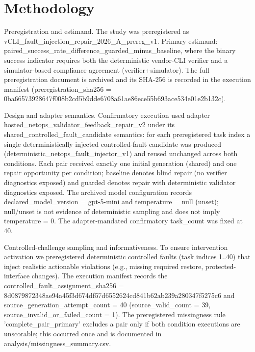 \documentclass[conference]{IEEEtran}
\begin{document}
\section{Methodology}
Preregistration and estimand. The study was preregistered as vCLI\_fault\_injection\_repair\_2026\_A\_prereg\_v1. Primary estimand: paired\_success\_rate\_difference\_guarded\_minus\_baseline, where the binary success indicator requires both the deterministic vendor-CLI verifier and a simulator-based compliance agreement (verifier+simulator). The full preregistration document is archived and its SHA-256 is recorded in the execution manifest (preregistration\_sha256 = 0ba66573\allowbreak{}928647f0\allowbreak{}08b2cd5b\allowbreak{}9dde6708\allowbreak{}a61ae86e\allowbreak{}ce55b693\allowbreak{}ace534e0\allowbreak{}1e2b132c).

Design and adapter semantics. Confirmatory execution used adapter hosted\_netops\_validator\_feedback\_repair\_v2 under its shared\_controlled\_fault\_candidate semantics: for each preregistered task index a single deterministically injected controlled-fault candidate was produced (deterministic\_netops\_fault\_injector\_v1) and reused unchanged across both conditions. Each pair received exactly one initial generation (shared) and one repair opportunity per condition; baseline denotes blind repair (no verifier diagnostics exposed) and guarded denotes repair with deterministic validator diagnostics exposed. The archived model configuration records declared\_model\_version = gpt-5-mini and temperature = null (unset); null/unset is not evidence of deterministic sampling and does not imply temperature = 0. The adapter-mandated confirmatory task\_count was fixed at 40.

Controlled-challenge sampling and informativeness. To ensure intervention activation we preregistered deterministic controlled faults (task indices 1..40) that inject realistic actionable violations (e.g., missing required restore, protected-interface changes). The execution manifest records the controlled\_fault\_assignment\_sha256 = 8d087987\allowbreak{}2348ae94\allowbreak{}a45f3d67\allowbreak{}4df57d65\allowbreak{}52624cd8\allowbreak{}41b62ab2\allowbreak{}39a28034\allowbreak{}7f5275c6 and source\_generation\_attempt\_count = 40 (source\_valid\_count = 39, source\_invalid\_or\_failed\_count = 1). The preregistered missingness rule 'complete\_pair\_primary' excludes a pair only if both condition executions are unscorable; this occurred once and is documented in analysis/missingness\_summary.csv.
\end{document}
